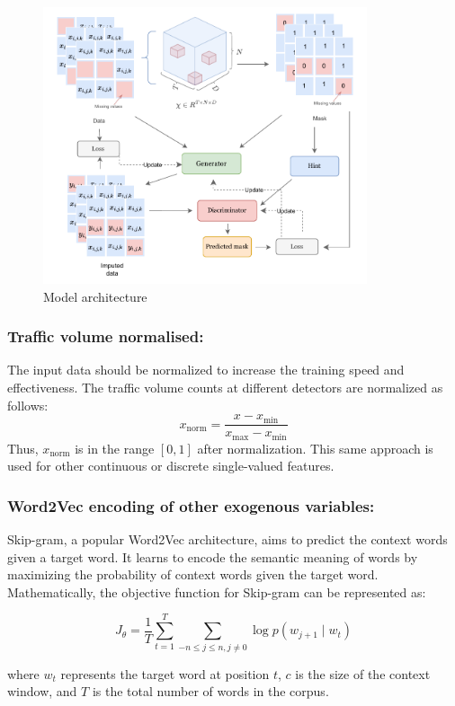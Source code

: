 \begin{figure}[htbp]
  \centering
  \includegraphics[width=0.85\textwidth]{model.pdf}
  \caption{Model architecture}
  \label{fig:dataset}
\end{figure}

\subsubsection{Traffic volume normalised:}
The input data should be normalized to increase the training speed and effectiveness. The traffic volume counts at different detectors are normalized as follows:
\[
x_{\text{norm}} = \frac{x - x_{\text{min}}}{x_{\text{max}} - x_{\text{min}}}
\]
Thus, \( x_{\text{norm}} \) is in the range \([0,1]\) after normalization. This same approach is used for other continuous or discrete single-valued features.

\subsubsection{Word2Vec encoding of other exogenous variables:}
Skip-gram\cite{skipgram}, a popular Word2Vec\cite{word2vec} architecture, aims to predict the context words given a target word. It learns to encode the semantic meaning of words by maximizing the probability of context words given the target word. Mathematically, the objective function for Skip-gram can be represented as:

\[
J_\theta = \frac{1}{T}\sum^{T}_{t=1}\sum_{-n\leq j \leq n, j \neq 0}\log p\left(w_{j+1} \mid w_{t}\right)
\]

where \( w_t \) represents the target word at position \( t \), \( c \) is the size of the context window, and \( T \) is the total number of words in the corpus.

